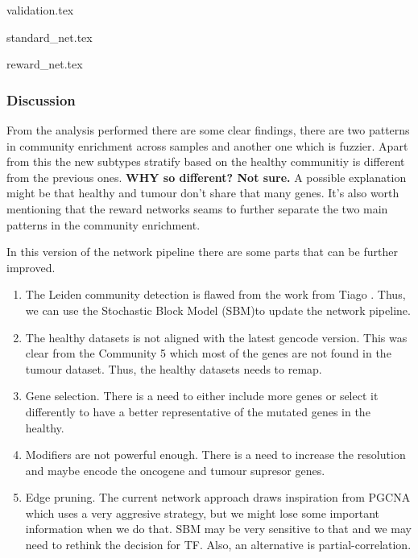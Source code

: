 {validation.tex}


{standard_net.tex}

{reward_net.tex}


\newpage

\subsubsection{Discussion}
From the analysis performed there are some clear findings, there are two patterns in community enrichment across samples and another one which is fuzzier. Apart from this the new subtypes stratify based on the healthy communitiy is different from the previous ones. \textbf{WHY so different? Not sure.} A possible explanation might be that healthy and tumour don't share that many genes. It's also worth mentioning that the reward networks seams to further separate the two main patterns in the community enrichment.

In this version of the network pipeline there are some parts that can be further improved.
\begin{enumerate}
    \item The Leiden community detection is flawed from the work from Tiago \cite{Peixoto2021-jx,Fortunato2016-tj}. Thus, we can use the Stochastic Block Model (SBM)\cite{Peixoto2017-ua}to update the network pipeline.
    \item The healthy datasets is not aligned with the latest gencode version. This was clear from the Community 5 which most of the genes are not found in the tumour dataset. Thus, the healthy datasets needs to remap.
    \item Gene selection. There is a need to either include more genes or select it differently to have a better representative of the mutated genes in the healthy.
    \item Modifiers are not powerful enough. There is a need to increase the resolution and maybe encode the oncogene and tumour supresor genes.
    \item Edge pruning. The current network approach draws inspiration from PGCNA which uses a very aggresive strategy, but we might lose some important information when we do that. SBM may be very sensitive to that and we may need to rethink the decision for TF. Also, an alternative is partial-correlation.
\end{enumerate}

